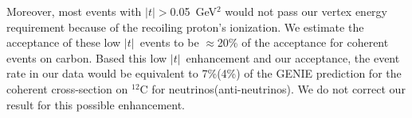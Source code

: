 \documentclass[aps,prl,twocolumn,showpacs,superscriptaddress,nofootinbib]{revtex4}
\newcommand{\tcoh}{\ensuremath{\left| t\right| \xspace}}
\begin{document}
Moreover, most events
with \tcoh$>$0.05~GeV$^2$ would not pass our vertex energy requirement because of the
recoiling proton's ionization.  We estimate the acceptance of these
low \tcoh\ events to be $\approx$20\% of the acceptance for coherent
events on carbon.  Based this low \tcoh\ enhancement and our
acceptance, the event rate in our data would be equivalent to 7\%(4\%) of the 
GENIE prediction for the coherent cross-section on
$^{12}$C for neutrinos(anti-neutrinos). We do not correct our result
for this possible enhancement.


\end{document}
